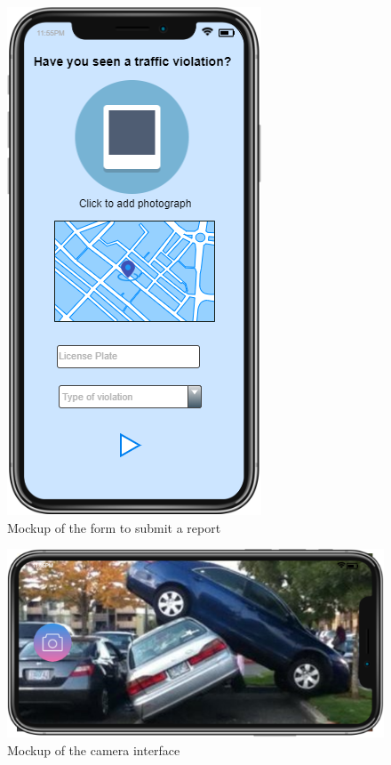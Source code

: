 	\newpage
	\begin{figure}[h!]
		\centering
		\includegraphics[scale=0.90]{Images/Report_Mockup}
		\caption{Mockup of the form to submit a report}
	\end{figure}
	\newpage
	\begin{figure}[h!]
		\centering
		\includegraphics[scale=0.55]{Images/Camera_Mockup}
		\caption{Mockup of the camera interface}
	\end{figure}
